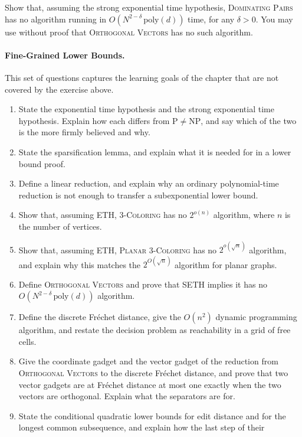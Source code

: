 Show that, assuming the strong exponential time hypothesis, \textsc{Dominating
Pairs} has no algorithm running in $O(N^{2-\delta}\,\mathrm{poly}(d))$ time,
for any $\delta > 0$. You may use without proof that \textsc{Orthogonal
Vectors} has no such algorithm.

\paragraph{Fine-Grained Lower Bounds.}
This set of questions captures the learning goals of the chapter that are not
covered by the exercise above.
\begin{enumerate}
  \item State the exponential time hypothesis and the strong exponential time
        hypothesis. Explain how each differs from
        $\mathrm{P} \ne \mathrm{NP}$, and say which of the two is the more
        firmly believed and why.
  \item State the sparsification lemma, and explain what it is needed for in a
        lower bound proof.
  \item Define a linear reduction, and explain why an ordinary polynomial-time
        reduction is not enough to transfer a subexponential lower bound.
  \item Show that, assuming ETH, \textsc{3-Coloring} has no $2^{o(n)}$
        algorithm, where $n$ is the number of vertices.
  \item Show that, assuming ETH, \textsc{Planar 3-Coloring} has no
        $2^{o(\sqrt n)}$ algorithm, and explain why this matches the
        $2^{O(\sqrt n)}$ algorithm for planar graphs.
  \item Define \textsc{Orthogonal Vectors} and prove that SETH implies it has
        no $O(N^{2-\delta}\,\mathrm{poly}(d))$ algorithm.
  \item Define the discrete Fr\'echet distance, give the $O(n^2)$ dynamic
        programming algorithm, and restate the decision problem as reachability
        in a grid of free cells.
  \item Give the coordinate gadget and the vector gadget of the reduction from
        \textsc{Orthogonal Vectors} to the discrete Fr\'echet distance, and
        prove that two vector gadgets are at Fr\'echet distance at most one
        exactly when the two vectors are orthogonal. Explain what the
        separators are for.
  \item State the conditional quadratic lower bounds for edit distance and for
        the longest common subsequence, and explain how the last step of their

\end{enumerate}
